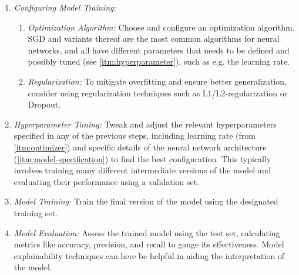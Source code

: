 \begin{fullwidth}
\begin{multicols}{2}
\begin{enumerate}
    \columnbreak
    \item \label{itm:training-specification}
        \textit{Configuring Model Training:}
        \begin{enumerate}%
        \item \label{itm:optimizer}
            \textit{Optimization Algorithm:} 
            Choose and configure an optimization algorithm.
            \Ac{SGD} and variants thereof 
            are the most common algorithms for neural networks,
            \unskip\footnotemark
            and all have different 
            parameters that needs to be defined and possibly tuned 
            (see \cref{itm:hyperparameter}), 
            such as e.g. the learning rate.

        \item \label{itm:regularization}
            \textit{Regularization:} 
            To mitigate overfitting and ensure better generalization,
            consider using regularization techniques such as 
            L1/L2-regularization or Dropout.
            \unskip\footnotemark
        \end{enumerate}

    \item \label{itm:hyperparameter}
        \textit{Hyperparameter Tuning:} 
        Tweak and adjust the relevant hyperparameters specified
        in any of the previous steps,
        including learning rate (from \cref{itm:optimizer})
        and specific details of the neural network architecture 
        (\cref{itm:model-specification})
        to find the best configuration.
        This typically involves training many different intermediate
        versions of the model and evaluating their performance
        using a validation set.

    \item \label{itm:training}
        \textit{Model Training:} 
        Train the final version of the model 
        using the designated training set.

    \item \label{itm:evaluation}
        \textit{Model Evaluation:} 
        Assess the trained model using the test set, 
        calculating metrics like accuracy, precision, and recall 
        to gauge its effectiveness.
        Model explainability techniques can here 
        be helpful in aiding the interpretation of the model.
\end{enumerate}
\end{multicols}
\end{fullwidth}

